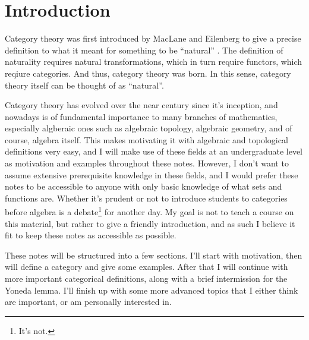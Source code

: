 \section{Introduction}
Category theory was first introduced by MacLane and Eilenberg to give a precise definition to what it meant for something to be ``natural'' \cite{riehl}. The definition of naturality requires natural transformations, which in turn require functors, which reqiure categories. And thus, category theory was born. In this sense, category theory itself can be thought of as ``natural''.

Category theory has evolved over the near century since it's inception, and nowadays is of fundamental importance to many branches of mathematics, especially algberaic ones such as algebraic topology, algebraic geometry, and of course, algebra itself. This makes motivating it with algebraic and topological definitions very easy, and I will make use of these fields at an undergraduate level as motivation and examples throughout these notes. However, I don't want to assume extensive prerequisite knowledge in these fields, and I would prefer these notes to be accessible to anyone with only basic knowledge of what sets and functions are. Whether it's prudent or not to introduce students to categories before algebra is a debate\footnote{It's not.} for another day. My goal is not to teach a course on this material, but rather to give a friendly introduction, and as such I believe it fit to keep these notes as accessible as possible.

These notes will be structured into a few sections. I'll start with motivation, then will define a category and give some examples. After that I will continue with more important categorical definitions, along with a brief intermission for the Yoneda lemma. I'll finish up with some more advanced topics that I either think are important, or am personally interested in.
